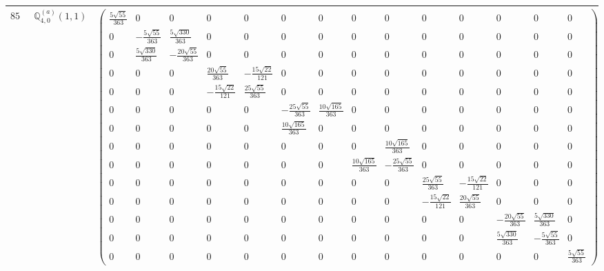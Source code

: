 \documentclass[fleqn,8pt,landscape]{jsarticle}
\begin{document}
\begin{center}
\begin{longtable}{ccc}
$ 859 $ & $ \mathbb{Q}_{4,0}^{(a)}(1,1) $ & $ \begin{pmatrix} \frac{5 \sqrt{55}}{363} & 0 & 0 & 0 & 0 & 0 & 0 & 0 & 0 & 0 & 0 & 0 & 0 & 0 \\ 0 & - \frac{5 \sqrt{55}}{363} & \frac{5 \sqrt{330}}{363} & 0 & 0 & 0 & 0 & 0 & 0 & 0 & 0 & 0 & 0 & 0 \\ 0 & \frac{5 \sqrt{330}}{363} & - \frac{20 \sqrt{55}}{363} & 0 & 0 & 0 & 0 & 0 & 0 & 0 & 0 & 0 & 0 & 0 \\ 0 & 0 & 0 & \frac{20 \sqrt{55}}{363} & - \frac{15 \sqrt{22}}{121} & 0 & 0 & 0 & 0 & 0 & 0 & 0 & 0 & 0 \\ 0 & 0 & 0 & - \frac{15 \sqrt{22}}{121} & \frac{25 \sqrt{55}}{363} & 0 & 0 & 0 & 0 & 0 & 0 & 0 & 0 & 0 \\ 0 & 0 & 0 & 0 & 0 & - \frac{25 \sqrt{55}}{363} & \frac{10 \sqrt{165}}{363} & 0 & 0 & 0 & 0 & 0 & 0 & 0 \\ 0 & 0 & 0 & 0 & 0 & \frac{10 \sqrt{165}}{363} & 0 & 0 & 0 & 0 & 0 & 0 & 0 & 0 \\ 0 & 0 & 0 & 0 & 0 & 0 & 0 & 0 & \frac{10 \sqrt{165}}{363} & 0 & 0 & 0 & 0 & 0 \\ 0 & 0 & 0 & 0 & 0 & 0 & 0 & \frac{10 \sqrt{165}}{363} & - \frac{25 \sqrt{55}}{363} & 0 & 0 & 0 & 0 & 0 \\ 0 & 0 & 0 & 0 & 0 & 0 & 0 & 0 & 0 & \frac{25 \sqrt{55}}{363} & - \frac{15 \sqrt{22}}{121} & 0 & 0 & 0 \\ 0 & 0 & 0 & 0 & 0 & 0 & 0 & 0 & 0 & - \frac{15 \sqrt{22}}{121} & \frac{20 \sqrt{55}}{363} & 0 & 0 & 0 \\ 0 & 0 & 0 & 0 & 0 & 0 & 0 & 0 & 0 & 0 & 0 & - \frac{20 \sqrt{55}}{363} & \frac{5 \sqrt{330}}{363} & 0 \\ 0 & 0 & 0 & 0 & 0 & 0 & 0 & 0 & 0 & 0 & 0 & \frac{5 \sqrt{330}}{363} & - \frac{5 \sqrt{55}}{363} & 0 \\ 0 & 0 & 0 & 0 & 0 & 0 & 0 & 0 & 0 & 0 & 0 & 0 & 0 & \frac{5 \sqrt{55}}{363} \end{pmatrix} $ \\ \hline

\end{longtable}
\end{center}
\end{document}
